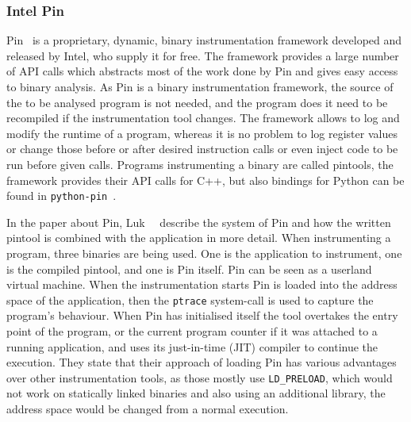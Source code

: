 \subsubsection{Intel Pin}

Pin~\cite{pintool} is a proprietary, dynamic, binary instrumentation framework
developed and released by Intel, who supply it for free. The framework provides
a large number of API calls which abstracts most of the work done by Pin and
gives easy access to binary analysis. As Pin is a binary instrumentation
framework, the source of the to be analysed program is not needed, and the
program does it need to be recompiled if the instrumentation tool changes. The
framework allows to log and modify the runtime of a program, whereas it is no
problem to log register values or change those before or after desired
instruction calls or even inject code to be run before given calls. Programs
instrumenting a binary are called pintools, the framework provides their API
calls for C++, but also bindings for Python can be found in
\texttt{python-pin}~\cite{pythonpin}.

In the paper about Pin, Luk~\etal~\cite{pintool} describe the system of Pin and
how the written pintool is combined with the application in more detail. When
instrumenting a program, three binaries are being used. One is the application
to instrument, one is the compiled pintool, and one is Pin itself. Pin can be
seen as a userland virtual machine. When the instrumentation starts Pin is
loaded into the address space of the application, then the \texttt{ptrace}
system-call is used to capture the program's behaviour. When Pin has initialised
itself the tool overtakes the entry point of the program, or the current program
counter if it was attached to a running application, and uses its just-in-time
(JIT) compiler to continue the execution. They state that their approach of
loading Pin has various advantages over other instrumentation tools, as those
mostly use \texttt{LD\_PRELOAD}, which would not work on statically linked
binaries and also using an additional library, the address space would be
changed from a normal execution.

